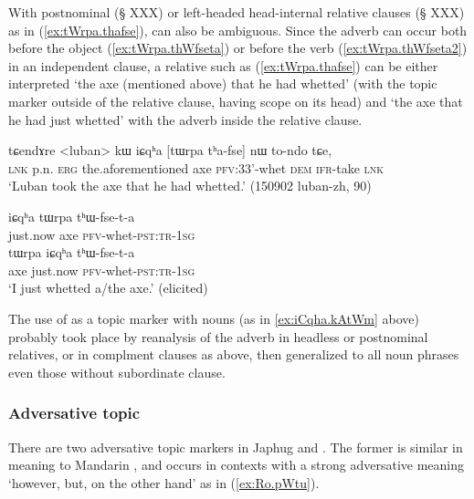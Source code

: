 With postnominal (§ XXX) or left-headed head-internal relative clauses (§ XXX) as in (\ref{ex:tWrpa.thafse}),  can also be ambiguous. Since the adverb  can occur both before the object (\ref{ex:tWrpa.thWfseta}) or before the verb (\ref{ex:tWrpa.thWfseta2}) in an independent clause, a relative such as (\ref{ex:tWrpa.thafse}) can be either interpreted `the axe (mentioned above) that he had whetted' (with the topic marker  outside of the relative clause, having scope on its head) and `the axe that he had just whetted' with the adverb  inside the relative clause.

 \begin{exe}
\ex \label{ex:tWrpa.thafse}
 \gll  tɕendɤre <luban> kɯ iɕqʰa [tɯrpa tʰa-fse] nɯ to-ndo tɕe, \\
 \textsc{lnk} p.n. \textsc{erg} the.aforementioned axe \textsc{pfv}:3\fl{}3'-whet \textsc{dem} \textsc{ifr}-take \textsc{lnk} \\
 \glt `Luban took the axe that he had whetted.' (150902 luban-zh, 90)
 \end{exe}

  \begin{exe}
  \ex 
  \begin{xlist}
\ex \label{ex:tWrpa.thWfseta}
 \gll   iɕqʰa tɯrpa tʰɯ-fse-t-a \\
just.now axe \textsc{pfv}-whet-\textsc{pst}:\textsc{tr}-\textsc{1sg} \\
\ex \label{ex:tWrpa.thWfseta2}
 \gll   tɯrpa  iɕqʰa tʰɯ-fse-t-a \\
 axe just.now \textsc{pfv}-whet-\textsc{pst}:\textsc{tr}-\textsc{1sg} \\
 \glt `I just whetted a/the axe.' (elicited)
 \end{xlist}
 \end{exe}

The use of  as a topic marker with nouns (as in \ref{ex:iCqha.kAtWm} above) probably took place by reanalysis of the adverb in headless or postnominal relatives, or in complment clauses as above, then generalized to all noun phrases even those without subordinate clause.

 \subsubsection{Adversative topic} \label{sec:adversative.topic}
There are two adversative topic markers in Japhug  and . The former is similar in meaning to Mandarin , and occurs in contexts with a strong adversative meaning `however, but, on the other hand' as in (\ref{ex:Ro.pWtu}).

